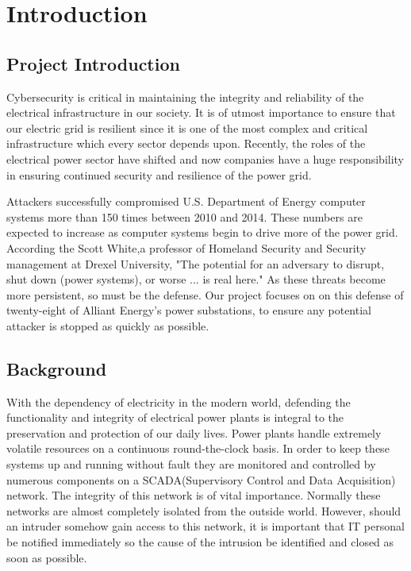 \chapter{Introduction}

\section{Project Introduction}

Cybersecurity is critical in maintaining the integrity and reliability of the electrical infrastructure in our society. It is of utmost importance to ensure that our electric grid is resilient since it is one of the most complex and critical infrastructure which every sector depends upon. Recently, the roles of the electrical power sector have shifted and now companies have a huge responsibility in ensuring continued security and resilience of the power grid. 

Attackers successfully compromised U.S. Department of Energy computer systems more than 150 times between 2010 and 2014. These numbers are expected to increase as computer systems begin to drive more of the power grid. According the Scott White,a professor of Homeland Security and Security management at Drexel University, "The potential for an adversary to disrupt, shut down (power systems), or worse ... is real here." As these threats become more persistent, so must be the defense. Our project focuses on on this defense of twenty-eight of Alliant Energy's power substations, to ensure any potential attacker is stopped as quickly as possible. 

\section{Background}
With the dependency of electricity in the modern world, defending the functionality and integrity of electrical power plants is integral to the preservation and protection of our daily lives. Power plants handle extremely volatile resources on a continuous round-the-clock basis. In order to keep these systems up and running without fault they are monitored and controlled by numerous components on a SCADA(Supervisory Control and Data Acquisition) network. The integrity of this network is of vital importance. Normally these networks are almost completely isolated from the outside world. However, should an intruder somehow gain access to this network, it is important that IT personal be notified immediately so the cause of the intrusion be identified and closed as soon as possible.

